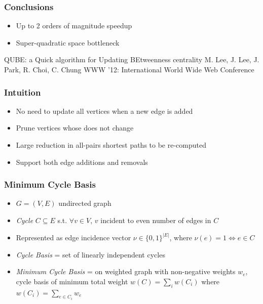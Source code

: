 \begin{frame}
  \frametitle{Conclusions}

  \begin{itemize}
    \item Up to 2 orders of magnitude speedup
    \item Super-quadratic space bottleneck
  \end{itemize}

\end{frame}


\begin{frame}
  \centering
  \vfill
  {\huge QUBE: a Quick algorithm for Updating BEtweenness centrality}
  \vfill
  {\Large M. Lee, J. Lee, J. Park, R. Choi, C. Chung}
  \vfill
  {\large WWW '12: International World Wide Web Conference}
  \vfill
\end{frame}

\begin{frame}
  \frametitle{Intuition}

  \begin{itemize}
    \item No need to update all vertices when a new edge is added
    \item Prune vertices whose \betw does not change
    \item Large reduction in all-pairs shortest paths to be re-computed
    \item Support both edge additions and removals
  \end{itemize}
\end{frame}


\begin{frame}
  \frametitle{Minimum Cycle Basis}

  \begin{itemize}
    \item $G=(V,E)$ undirected graph
    \item \emph{Cycle} $C \subseteq E$ s.t. $\forall v \in V$, $v$ incident to even number of edges in $C$
    \item Represented as edge incidence vector $\nu \in \{ 0,1 \}^{|E|}$, where $\nu(e) = 1 \iff e \in C$
    \item \emph{Cycle Basis} = set of linearly independent cycles
    \item \emph{Minimum Cycle Basis} = on weighted graph with non-negative weights $w_e$, cycle basis of minimum total weight $w(C) = \sum_{i} w(C_i)$ where $w(C_i) = \sum_{e \in C_i} w_e$
  \end{itemize}
\end{frame}


